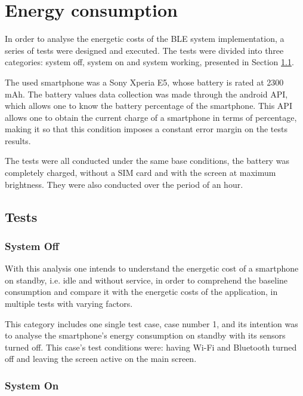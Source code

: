 \section{Energy consumption}  
\label{sec:energetic}  
  
  
In order to analyse the energetic costs of the \ac{BLE} system implementation, a series of tests were designed and executed. The tests were divided into three categories: system off, system on and system working, presented in Section \ref{subsec:tests}.  
  
 
 
The used smartphone was a Sony Xperia E5, whose battery is rated at 2300 mAh. The battery values data collection was made through the android API, which allows one to know the battery percentage of the smartphone. This API allows one to obtain the current charge of a smartphone in terms of percentage, making it so that this condition imposes a constant error margin on the tests results.   
  
  
The tests were all conducted under the same base conditions, the battery was completely charged, without a SIM card and with the screen at maximum brightness. They were also conducted over the period of an hour.  
  
  
\subsection{Tests}  
\label{subsec:tests}  
  
  
\subsubsection{System Off}  
\label{subsec:sysoff}  
  
  
With this analysis one intends to understand the energetic cost of a smartphone on standby, i.e. idle and without service, in order to comprehend the baseline consumption and compare it with the energetic costs of the application, in multiple tests with varying factors.  
  
  
This category includes one single test case, case number 1, and its intention was to analyse the smartphone's energy consumption on standby with its sensors turned off. This case's test conditions were: having Wi-Fi and Bluetooth turned off and leaving the screen active on the main screen.  
  
  
\subsubsection{System On}  
\label{subsec:syson}  
  
